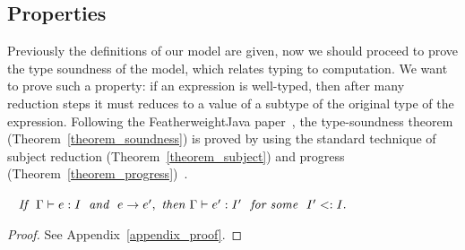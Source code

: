 \begin{comment}
$mbody(m, I)$ algorithm:
\begin{itemize}
	\item If m is defined in I directly, then return I.m()
	\item Else, let $\overline{I'} = mdefined(fathers(I))$, all ancestors of $I$ that has directly defined $m()$.
	\item $\overline{I''} = needed(\overline{I'})$, keep only interfaces that are needed, which are not super-interface of others.
	\item If $\overline{I''}$ is unique, then return this unique one. Else if any two I1,I2 in $\overline{I''}$ share a parent in $\overline{I'}$, then diamond conflict is detected, report error. Else return multiple $m()$s.
\end{itemize}
\end{comment}

\begin{comment}
\subsubsection{\collectMethods}
\[ \collectMethods(I) = \left( \bigcup_{I_i \in \overline{I}} \methods(I_i) \right) \bigcup \methods(I) \]
\[ \methods(I) = \overline{M}, \text{where } IT(I) = \interface{I}{I}{M} \]
\end{comment}



\subsection{Properties}
Previously the definitions of our model are given, now we should proceed to prove the type soundness of 
the model, which relates typing to computation. We want to prove such a property: if an expression is 
well-typed, then after many reduction steps it must reduces to a value of a subtype of the original type
of the expression. Following the FeatherweightJava paper~\cite{Igarashi01FJ}, the type-soundness theorem 
(Theorem~\ref{theorem_soundness}) is proved by using the standard technique of subject reduction (Theorem~\ref{theorem_subject})
and progress (Theorem~\ref{theorem_progress})~\cite{Wright1994}.

\begin{theorem}~\label{theorem_subject}
$\textit{If } \ \judgeewf \Gamma {e : I} \; \textit{ and } \ e \rightarrow e',\ 
\textit{then } \judgeewf \Gamma {e' : I'} \ \textit{ for some } \ I' <: I.$
\end{theorem}
\begin{proof}
See Appendix~\ref{appendix_proof}.
\end{proof}

